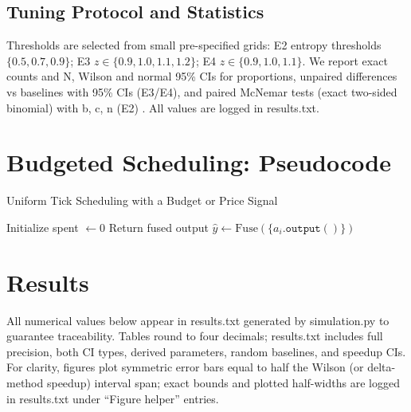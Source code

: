 \subsection{Tuning Protocol and Statistics}
Thresholds are selected from small pre-specified grids: E2 entropy thresholds $\{0.5, 0.7, 0.9\}$; E3 $z \in \{0.9,1.0,1.1,1.2\}$; E4 $z \in \{0.9,1.0,1.1\}$. We report exact counts and N, Wilson and normal 95\% CIs for proportions, unpaired differences vs baselines with 95\% CIs (E3/E4), and paired McNemar tests (exact two-sided binomial) with b, c, n (E2) \cite{Agresti2002,McNemar1947}. All values are logged in results.txt.

\section{Budgeted Scheduling: Pseudocode}
\label{sec:algo}
\begin{adjustbox}{width=\linewidth}
\begin{minipage}{\linewidth}
\begin{algorithm}[H]
\DontPrintSemicolon
\caption{Uniform Tick Scheduling with a Budget or Price Signal}
Initialize spent $\leftarrow 0$\;
Return fused output $\hat{y} \leftarrow \text{Fuse}(\{a_i.\texttt{output}()\})$\;
\end{algorithm}
\end{minipage}
\end{adjustbox}

\section{Results}
\label{sec:results}
All numerical values below appear in results.txt generated by simulation.py to guarantee traceability. Tables round to four decimals; results.txt includes full precision, both CI types, derived parameters, random baselines, and speedup CIs. For clarity, figures plot symmetric error bars equal to half the Wilson (or delta-method speedup) interval span; exact bounds and plotted half-widths are logged in results.txt under ``Figure helper'' entries.

